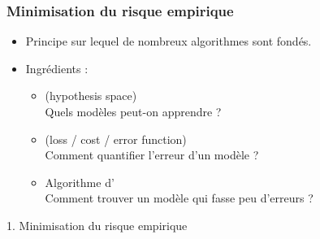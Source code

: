 \begin{frame}
  \frametitle{Minimisation du risque empirique}
  \begin{itemize}
  \item Principe sur lequel de nombreux algorithmes  sont fondés.
  \item Ingrédients :
    \begin{itemize}
    \setlength{\itemsep}{5pt}
    \item {} \textcolor{gray!70}{(hypothesis space)} \\ \hspace{1em} Quels modèles peut-on apprendre ?
    \item {} \textcolor{gray!70}{(loss / cost / error function)} \\ \hspace{1em} Comment quantifier l'erreur d'un modèle ?
    \item Algorithme d' \\ \hspace{1em} Comment trouver un
      modèle qui fasse peu d'erreurs ?
    \end{itemize}
  \end{itemize}
\end{frame}


\begin{frame}
  \begin{center}
    \large{1. Minimisation du risque empirique}
  \end{center}
\end{frame}


